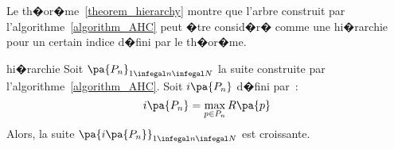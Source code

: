 Le th�or�me~\ref{theorem_hierarchy} montre que l'arbre construit par l'algorithme~\ref{algorithm_AHC} peut �tre
consid�r� comme une hi�rarchie pour un certain indice d�fini par le th�or�me.


            \begin{xtheorem}{hi�rarchie}\label{theorem_hierarchy}
            Soit $\pa{P_n}_{1 \infegal n \infegal N}$ la suite construite par l'algorithme~\ref{algorithm_AHC}. 
            Soit $i\pa{P_n}$ d�fini par~:
                $$
                i\pa{P_n} = \underset{p \in P_n} {\max} \, R\pa{p}
                $$
            Alors, la suite $\pa{i\pa{P_n}}_{1 \infegal n \infegal N}$ est croissante.
            \end{xtheorem}





